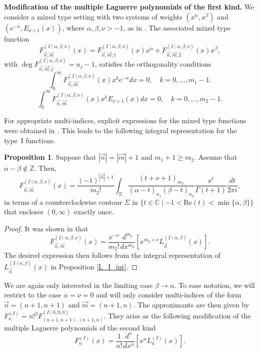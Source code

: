 \documentclass[a4paper,12pt,oneside]{article}
\theoremstyle{definition}
\newtheorem{prop}[defi]{Proposition}
\newcommand{\Z}{\mathbb{Z}}
\newcommand{\C}{\mathbb{C}}
\newcommand{\sz}[1]{\left| \vec{#1} \right|}
\begin{document}

\textbf{Modification of the multiple Laguerre polynomials of the first kind.} We consider a mixed type setting with two systems of weights $(x^{\alpha},x^{\beta})$ and $(e^{-x},E_{\nu+1}(x))$, where $\alpha,\beta,\nu>-1$, as in \cite[Section 4.2]{VAWolfs}. The associated mixed type function 
$$F_{\vec{n},\vec{m}}^{(I\mid \alpha,\beta,\nu)}(x) = F_{\vec{n},\vec{m};1}^{(I\mid \alpha,\beta,\nu)}(x) x^\alpha + F_{\vec{n},\vec{m};2}^{(I\mid \alpha,\beta,\nu)}(x) x^\beta,$$
with $\deg F_{\vec{n},\vec{m};j}^{(I\mid \alpha,\beta,\nu)} = n_j-1 $, satisfies the orthogonality conditions
    $$ \int_0^\infty F_{\vec{n},\vec{m}}^{(I\mid \alpha,\beta,\nu)}(x) x^k e^{-x} dx = 0,\quad k=0,\dots,m_1-1. $$
    $$ \int_0^\infty F_{\vec{n},\vec{m}}^{(I\mid \alpha,\beta,\nu)}(x) x^k E_{\nu+1}(x) dx = 0,\quad k=0,\dots,m_2-1. $$

For appropriate multi-indices, explicit expressions for the mixed type functions were obtained in \cite[Section 4.2]{VAWolfs}. This leads to the following integral representation for the type~I functions. 

\begin{prop} \label{I_int}
Suppose that $\sz{n}=\sz{m}+1$ and $m_1+1\geq m_2$. Assume that $\alpha-\beta\not\in\Z$. Then,
   $$ F_{\vec{n},\vec{m}}^{(I\mid \alpha,\beta,\nu)}(x) =  \frac{(-1)^{\sz{n}+1}}{m_2!} \int_\Sigma  \frac{(t+\nu+1)_{m_2} }{(\alpha-t)_{n_1}(\beta-t)_{n_2}} \frac{x^t}{\Gamma(t+1)} \frac{dt}{2\pi i}, $$
   in terms of a counterclockwise contour $\Sigma$ in $\{t\in\C\mid -1< \text{Re}(t) < \min\{\alpha,\beta\}\}$ that encloses $(0,\infty)$ exactly once.
\end{prop}
\begin{proof}
It was shown in \cite[Theorem 4.8]{VAWolfs} that
$$F_{\vec{n},\vec{m}}^{(I\mid \alpha,\beta,\nu)}(x) = \frac{x^{-\nu}}{m_2!} \frac{d^{m_2}}{dx^{m_2}}\left[x^{m_2+\nu} L_{\vec{n}}^{(I\mid \alpha,\beta)}(x) \right].$$
The desired expression then follows from the integral representation of $L_{\vec{n}}^{(I\mid \alpha,\beta)}(x)$ in Proposition \ref{L_I_int}.
\end{proof}

We are again only interested in the limiting case $\beta\to\alpha$. To ease notation, we will restrict to the case $\alpha=\nu=0$ and will only consider multi-indices of the form $\vec{n} = (n+1,n+1)$ and $\vec{m} = (n+1,n)$. The approximants are then given by $F_{n}^{(I)} = n!^2 F_{(n+1,n+1),(n+1,n)}^{(I\mid 0,0,0)} $. They arise as the following modification of the multiple Laguerre polynomials of the second kind
\begin{equation} \label{I_Rodr}
    F_{n}^{(I)}(x) = \frac{1}{n!} \frac{d^n}{dx^n}[x^n L_n^{(I)}(x)].
\end{equation}
\end{document}
